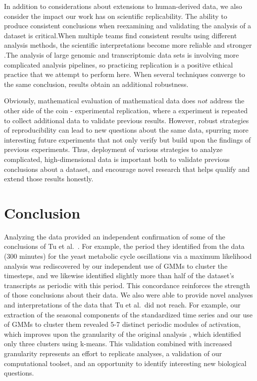 \documentclass[11pt]{amsart}
\begin{document}
In addition to considerations about extensions to human-derived data, we also consider the impact our work has on scientific replicability. The ability to produce consistent conclusions when reexamining and validating the analysis of a dataset is critical.When multiple teams find consistent results using different analysis methods, the scientific interpretations become more reliable and stronger \cite{botvinik-nezer_variability_2020}.The analysis of large genomic and transcriptomic data sets is involving more complicated analysis pipelines, so practicing replication is a positive ethical practice that we attempt to perform here. When several techniques converge to the same conclusion, results obtain an additional robustness.

Obviously, mathematical evaluation of mathematical data does $\textit{not}$ address the other side of the coin - experimental replication, where a experiment is repeated to collect additional data to validate previous results. However, robust strategies of reproducibility can lead to new questions about the same data, spurring more interesting future experiments that not only verify but build upon the findings of previous experiments. Thus, deployment of various strategies to analyze complicated, high-dimensional data is important both to validate previous conclusions about a dataset, and encourage novel research that helps qualify and extend those results honestly.

\section{Conclusion} 
Analyzing the data provided an independent confirmation of some of the conclusions of Tu et al.\ \cite{Tu2005}. For example, the period they identified from the data (300 minutes) for the yeast metabolic cycle oscillations via a maximum likelihood analysis was rediscovered by our independent use of GMMs to cluster the timesteps, and we likewise identified slightly more than half of the dataset's transcripts as periodic with this period. This concordance reinforces the strength of those conclusions about their data. We also were able to provide novel analyses and interpretations of the data that Tu et al.\ did not reach. For example, our extraction of the seasonal components of the standardized time series and our use of GMMs to cluster them revealed 5-7 distinct periodic modules of activation, which improves upon the granularity of the original analysis \cite{Tu2005}, which identified only three clusters using k-means. This validation combined with increased granularity represents an effort to replicate analyses, a validation of our computational toolset, and an opportunity to identify interesting new biological questions.
\end{document}
